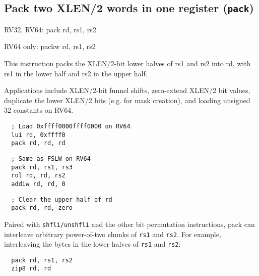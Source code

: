 \subsection{Pack two XLEN/2 words in one register (\texttt{pack})}

\begin{rvb}
  RV32, RV64:
    pack rd, rs1, rs2

  RV64 only:
    packw rd, rs1, rs2
\end{rvb}

This instruction packs the XLEN/2-bit lower halves of rs1 and rs2 into
rd, with rs1 in the lower half and rs2 in the upper half.



Applications include XLEN/2-bit funnel shifts, zero-extend XLEN/2 bit values, duplicate the lower
XLEN/2 bits (e.g. for mask creation), and loading unsigned 32 constants on RV64.

\begin{minipage}{\linewidth}
\begin{verbatim}
  ; Load 0xffff0000ffff0000 on RV64
  lui rd, 0xffff0
  pack rd, rd, rd
\end{verbatim}
\end{minipage}

\begin{minipage}{\linewidth}
\begin{verbatim}
  ; Same as FSLW on RV64
  pack rd, rs1, rs3
  rol rd, rd, rs2
  addiw rd, rd, 0
\end{verbatim}
\end{minipage}

\begin{minipage}{\linewidth}
\begin{verbatim}
  ; Clear the upper half of rd
  pack rd, rd, zero
\end{verbatim}
\end{minipage}

Paired with {\tt shfli/unshfli} and the other bit permutation instructions,
pack can interleave arbitrary power-of-two chunks of {\tt rs1} and {\tt rs2}. For
example, interleaving the bytes in the lower halves of {\tt rs1} and {\tt rs2}:

\begin{minipage}{\linewidth}
\begin{verbatim}
  pack rd, rs1, rs2
  zip8 rd, rd
\end{verbatim}
\end{minipage}

